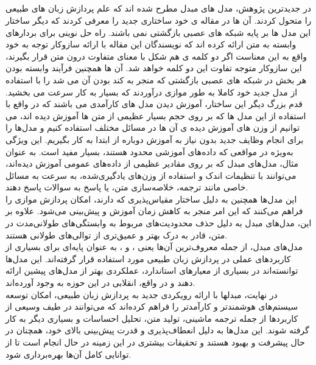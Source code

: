 \subsection{}
در جدیدترین پژوهش، مدل های مبدل مطرح شده اند که علم پردازش زبان های طبیعی را متحول کردند. آن ها در
مقاله ی خود ساختاری جدید را معرفی کردند که دیگر ساختار این مدل ها بر پایه شبکه های عصبی بازگشتی نمی باشند.
راه حل نوینی برای بردارهای وابسته به متن ارائه کرده اند که
نویسندگان این مقاله با ارائه سازوکار توجه به خود
واقع به این معناست اگر دو کلمه ی هم شکل با معنای متفاوت درون متن قرار بگیرند، این سازوکار متوجه تفاوت این دو کلمه
خواهد شد. آن ها همچنین فرآیند وابسته بودن هر بخش در شبکه های عصبی بازگشتی که منجر به کند بودن آن می شد را
با استفاده از مدل جدید خود کاملا به طور موازی درآوردند که بسیار به کار سرعت می بخشید.
قدم بزرگ دیگر این ساختار، آموزش دیدن مدل های کارآمدی می باشند که در واقع با استفاده
از این مدل ها که بر روی حجم بسیار عظیمی از متن ها آموزش دیده اند، می توانیم از وزن های آموزش دیده ی آن ها در مسائل مختلف استفاده کنیم و مدل‌ها را برای انجام وظایف جدید بدون نیاز به آموزش دوباره از ابتدا به کار بگیریم. این ویژگی به‌ویژه در مواقعی که داده‌های آموزشی محدود هستند، بسیار مفید است. به عنوان مثال، مدل‌های مبدل که بر روی مقادیر عظیمی از داده‌های عمومی آموزش دیده‌اند، می‌توانند با تنظیمات اندک و استفاده از وزن‌های یادگیری‌شده، به سرعت به مسائل خاصی مانند ترجمه، خلاصه‌سازی متن، یا پاسخ به سوالات پاسخ دهند.
\\
این مدل‌ها همچنین به دلیل ساختار مقیاس‌پذیری که دارند، امکان پردازش موازی را فراهم می‌کنند که این امر منجر به کاهش زمان آموزش و پیش‌بینی می‌شود. علاوه بر این، مدل‌های مبدل به دلیل حذف محدودیت‌های مربوط به وابستگی‌های طولانی‌مدت در متن، قادر به درک بهتر و عمیق‌تری از توالی‌های طولانی هستند.
\\
مدل‌های مبدل، از جمله معروف‌ترین آن‌ها یعنی ،  و ، به عنوان پایه‌ای برای بسیاری از کاربردهای عملی در پردازش زبان طبیعی مورد استفاده قرار گرفته‌اند. این مدل‌ها توانسته‌اند در بسیاری از معیارهای استاندارد، عملکردی بهتر از مدل‌های پیشین ارائه دهند و در واقع، انقلابی در این حوزه به وجود آورده‌اند.
\\
در نهایت، مبدلها با ارائه رویکردی جدید به پردازش زبان طبیعی، امکان توسعه سیستم‌های هوشمندتر و کارآمدتر را فراهم کرده‌اند که می‌توانند در طیف وسیعی از کاربردها از جمله ترجمه ماشینی، تولید متن، تحلیل احساسات و بسیاری دیگر به کار گرفته شوند. این مدل‌ها به دلیل انعطاف‌پذیری و قدرت پیش‌بینی بالای خود، همچنان در حال پیشرفت و بهبود هستند و تحقیقات بیشتری در این زمینه در حال انجام است تا از توانایی کامل آن‌ها بهره‌برداری شود.
\cite{vaswani2017attention}

